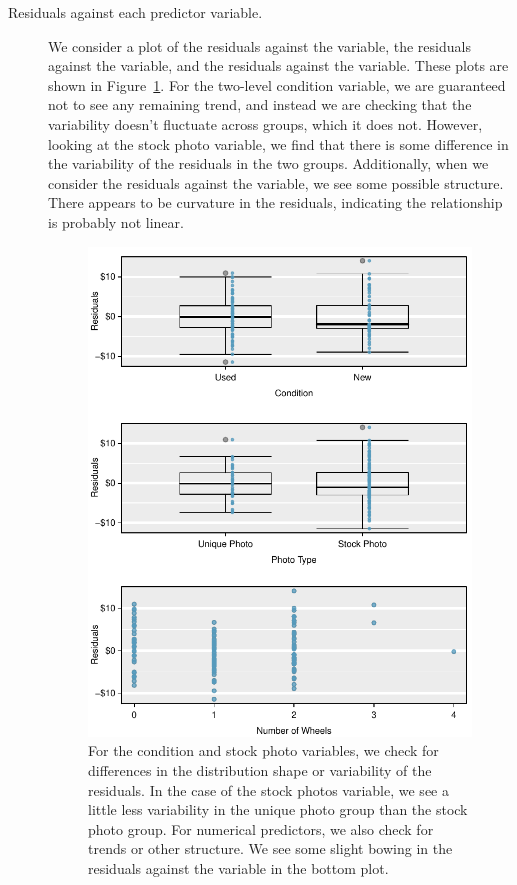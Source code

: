 \begin{description}
\item[Residuals against each predictor variable.] We consider a plot of the residuals against the  variable, the residuals against the  variable, and the residuals against the  variable. These plots are shown in Figure~\ref{mkDiagnosticEvsVariables}. For the two-level condition variable, we are guaranteed not to see any remaining trend, and instead we are checking that the variability doesn't fluctuate across groups, which it does not. However, looking at the stock photo variable, we find that there is some difference in the variability of the residuals in the two groups. Additionally, when we consider the residuals against the  variable, we see some possible structure. There appears to be curvature in the residuals, indicating the relationship is probably not linear.

\begin{figure}
\centering
\includegraphics[width=\textwidth]{ch_regr_mult_and_log/figures/marioKartDiagnostics/mkDiagnosticEvsVariables}
\caption{For the condition and stock photo variables, we check for differences in the distribution shape or variability of the residuals. In the case of the stock photos variable, we see a little less variability in the unique photo group than the stock photo group. For numerical predictors, we also check for trends or other structure. We see some slight bowing in the residuals against the  variable in the bottom plot.}
\label{mkDiagnosticEvsVariables}
\end{figure}


\end{description}
